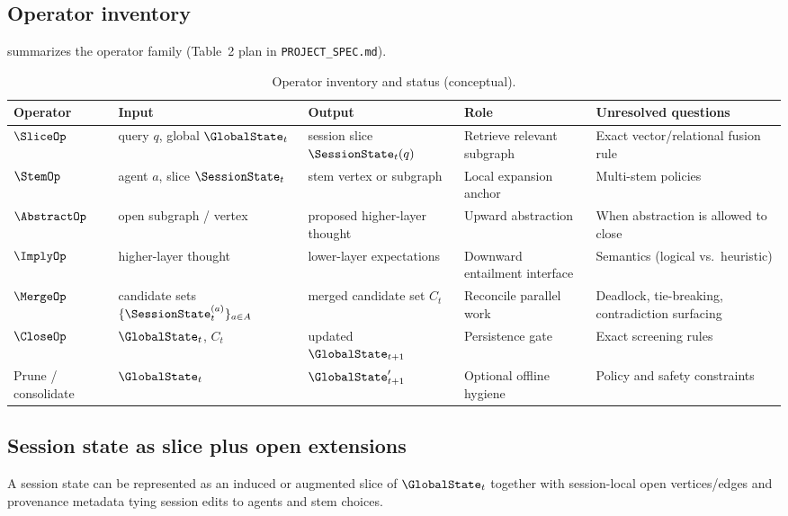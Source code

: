 \subsection{Operator inventory}
 summarizes the operator family (Table~2 plan in \texttt{PROJECT\_SPEC.md}).

\begin{table}[t]
  \centering
  \small
  \caption{Operator inventory and status (conceptual).}
  \label{tab:operators}
  \begin{tabular}{@{}p{2.0cm}p{3.0cm}p{3.0cm}p{2.4cm}p{3.0cm}@{}}
    \toprule
    Operator & Input & Output & Role & Unresolved questions \\
    \midrule
    $\SliceOp$ & query $q$, global $\GlobalState_t$ & session slice $\SessionState_t(q)$ & Retrieve relevant subgraph & Exact vector/relational fusion rule \\
    $\StemOp$ & agent $a$, slice $\SessionState_t$ & stem vertex or subgraph & Local expansion anchor & Multi-stem policies \\
    $\AbstractOp$ & open subgraph / vertex & proposed higher-layer thought & Upward abstraction & When abstraction is allowed to close \\
    $\ImplyOp$ & higher-layer thought & lower-layer expectations & Downward entailment interface & Semantics (logical vs.\ heuristic) \\
    $\MergeOp$ & candidate sets $\{\SessionState_t^{(a)}\}_{a\in A}$ & merged candidate set $C_t$ & Reconcile parallel work & Deadlock, tie-breaking, contradiction surfacing \\
    $\CloseOp$ & $\GlobalState_t$, $C_t$ & updated $\GlobalState_{t+1}$ & Persistence gate & Exact screening rules \\
    Prune / consolidate & $\GlobalState_t$ & $\GlobalState_{t+1}'$ & Optional offline hygiene & Policy and safety constraints \\
    \bottomrule
  \end{tabular}
\end{table}

\subsection{Session state as slice plus open extensions}
\begin{proposition}
\label{prop:session-slice}
A session state can be represented as an induced or augmented slice of $\GlobalState_t$ together with session-local open vertices/edges and provenance metadata tying session edits to agents and stem choices.
\end{proposition}

